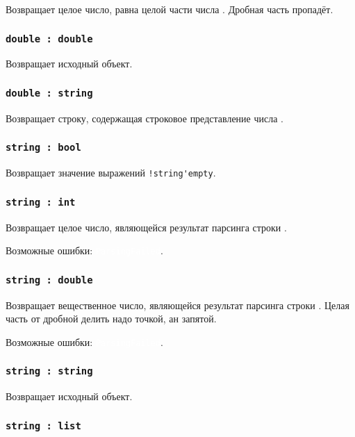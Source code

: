 \documentclass[a4paper, 14pt]{extarticle}
\newcommand{\ferror}[1]{{\fontsize{11pt}{12pt} \tt \colorbox{function}{\textcolor{white}{#1}}}}
\begin{document}
Возвращает целое число, равна целой части числа \double. Дробная часть пропадёт.

\subsubsection{\lstinline|double : double|}

Возвращает исходный объект.

\subsubsection{\lstinline|double : string|}

Возвращает строку, содержащая строковое представление числа \double.

\subsubsection{\lstinline|string : bool|}

Возвращает значение выражений \lstinline|!string'empty|.

\subsubsection{\lstinline|string : int|}

Возвращает целое число, являющейся результат парсинга строки \str.

Возможные ошибки: \ferror{ParsingFailed}.

\subsubsection{\lstinline|string : double|}

Возвращает вещественное число, являющейся результат парсинга строки \str. Целая часть от дробной делить надо точкой, ан запятой.

Возможные ошибки: \ferror{ParsingFailed}.

\subsubsection{\lstinline|string : string|}

Возвращает исходный объект.

\subsubsection{\lstinline|string : list|}
\end{document}
